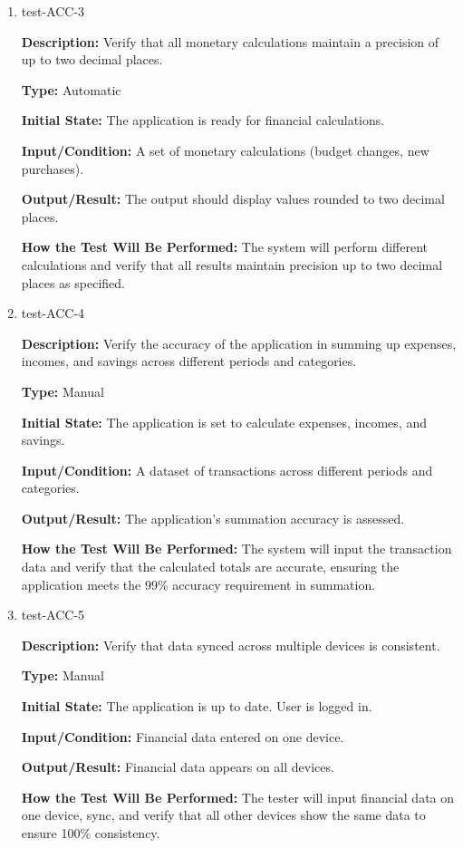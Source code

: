 \documentclass[12pt, titlepage]{article}
\begin{document}
\begin{enumerate}
\item{test-ACC-3\\}

\textbf{Description:} Verify that all monetary calculations maintain a
precision of up to two decimal places.

\textbf{Type:} Automatic
					
\textbf{Initial State:} The application is ready for financial calculations.
					
\textbf{Input/Condition:} A set of monetary calculations (budget changes, new
purchases).
					
\textbf{Output/Result:} The output should display values rounded to two decimal
places.
					
\textbf{How the Test Will Be Performed:} The system will perform different
calculations and verify that all results maintain precision up to two decimal
places as specified.

\item{test-ACC-4\\}

\textbf{Description:} Verify the accuracy of the application in summing up
expenses, incomes, and savings across different periods and categories.

\textbf{Type:} Manual
					
\textbf{Initial State:} The application is set to calculate expenses, incomes,
and savings.
					
\textbf{Input/Condition:} A dataset of transactions across different periods and
categories.
					
\textbf{Output/Result:} The application's summation accuracy is assessed.
					
\textbf{How the Test Will Be Performed:} The system will input the transaction
data and verify that the calculated totals are accurate, ensuring the
application meets the 99\% accuracy requirement in summation.

\item{test-ACC-5\\}

\textbf{Description:} Verify that data synced across multiple devices is
consistent.

\textbf{Type:} Manual
					
\textbf{Initial State:} The application is up to date. User is logged in.
					
\textbf{Input/Condition:} Financial data entered on one device.
					
\textbf{Output/Result:} Financial data appears on all devices.
					
\textbf{How the Test Will Be Performed:} The tester will input financial data on
one device, sync, and verify that all other devices show the same data to ensure
100\% consistency.

\end{enumerate}
\end{document}
